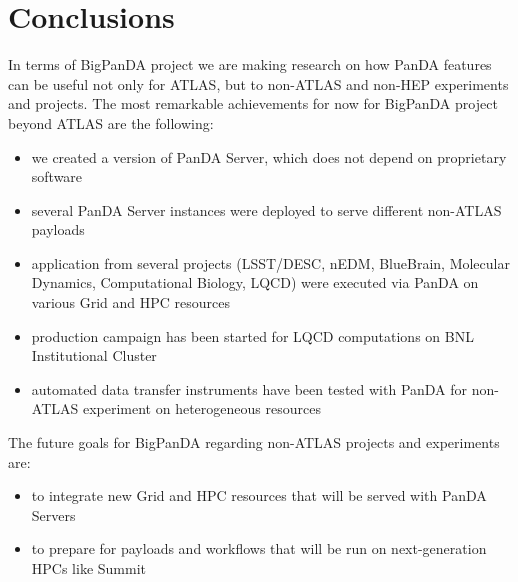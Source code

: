 \documentclass{webofc}
\begin{document}
\section{Conclusions}

In terms of BigPanDA project we are making research on how PanDA features can be useful not only for ATLAS, but to non-ATLAS and non-HEP experiments and projects.
The most remarkable achievements for now for BigPanDA project beyond ATLAS are the following:

\begin{itemize}
	\item we created a version of PanDA Server, which does not 	depend on proprietary software
	\item several PanDA Server instances were deployed to serve different non-ATLAS payloads
	\item application from several projects (LSST/DESC, nEDM, BlueBrain, Molecular Dynamics, Computational Biology, LQCD) were executed via PanDA on various Grid and HPC resources
	\item production campaign has been started for LQCD computations on BNL Institutional Cluster
	\item automated data transfer instruments have been tested with PanDA for non-ATLAS experiment on heterogeneous resources
\end{itemize}

The future goals for BigPanDA regarding non-ATLAS projects and experiments are:

\begin{itemize}
	\item to integrate new Grid and HPC resources that will be served with PanDA Servers
	\item to prepare for payloads and workflows that will be run on next-generation HPCs like Summit
\end{itemize}

\bigskip


\end{document}

